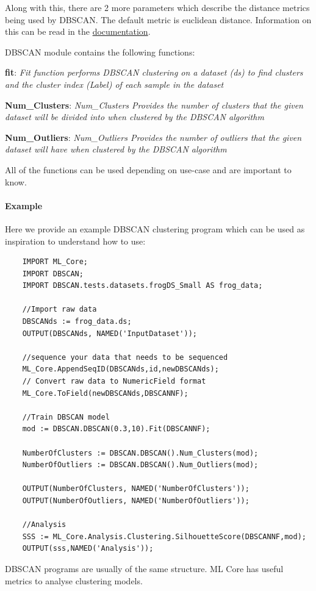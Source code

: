 \documentclass[a4paper,oneside,12pt]{book}
\begin{document}
Along with this, there are 2 more parameters which describe the distance metrics being used by DBSCAN. The default metric is euclidean distance. Information on this can be read in the \href{https://cdn.hpccsystems.com/pdf/ml/dbscan.pdf}{documentation}.

DBSCAN module contains the following functions:

\textbf{fit}: \textit{Fit function performs DBSCAN clustering on a dataset (ds) to find clusters and the cluster index (Label) of each sample in the dataset}

\textbf{Num\_Clusters}: \textit{Num\_Clusters Provides the number of clusters that the given dataset will be divided into when clustered by the DBSCAN algorithm}

\textbf{Num\_Outliers}: \textit{Num\_Outliers Provides the number of outliers that the given dataset will have when clustered by the DBSCAN algorithm}

All of the functions can be used depending on use-case and are important to know.

\paragraph{Example}

Here we provide an example DBSCAN clustering program which can be used as inspiration to understand how to use:

\begin{lstlisting}
    IMPORT ML_Core;
    IMPORT DBSCAN;
    IMPORT DBSCAN.tests.datasets.frogDS_Small AS frog_data;
    
    //Import raw data
    DBSCANds := frog_data.ds;
    OUTPUT(DBSCANds, NAMED('InputDataset'));
    
    //sequence your data that needs to be sequenced
    ML_Core.AppendSeqID(DBSCANds,id,newDBSCANds);
    // Convert raw data to NumericField format
    ML_Core.ToField(newDBSCANds,DBSCANNF);
    
    //Train DBSCAN model 
    mod := DBSCAN.DBSCAN(0.3,10).Fit(DBSCANNF);
    
    NumberOfClusters := DBSCAN.DBSCAN().Num_Clusters(mod);
    NumberOfOutliers := DBSCAN.DBSCAN().Num_Outliers(mod);
    
    OUTPUT(NumberOfClusters, NAMED('NumberOfClusters'));
    OUTPUT(NumberOfOutliers, NAMED('NumberOfOutliers'));
    
    //Analysis
    SSS := ML_Core.Analysis.Clustering.SilhouetteScore(DBSCANNF,mod);
    OUTPUT(sss,NAMED('Analysis'));
\end{lstlisting}

DBSCAN programs are usually of the same structure. ML Core has useful metrics to analyse clustering models.
\end{document}
